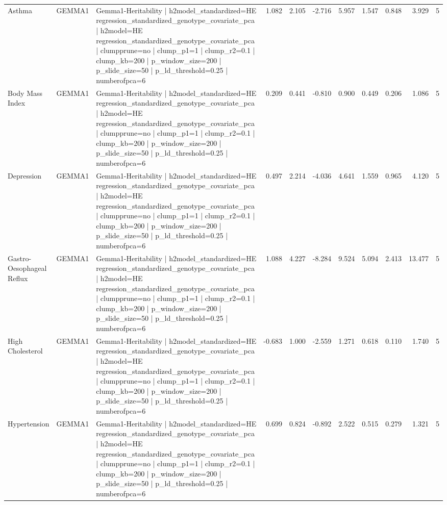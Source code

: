 \begin{landscape}
\begin{longtable}{p{2.4cm}p{1.8cm}p{6.0cm}rrrrrrrr}
Asthma & GEMMA1 & Gemma1-Heritability | h2model\_standardized=HE regression\_standardized\_genotype\_covariate\_pca | h2model=HE regression\_standardized\_genotype\_covariate\_pca | clumpprune=no | clump\_p1=1 | clump\_r2=0.1 | clump\_kb=200 | p\_window\_size=200 | p\_slide\_size=50 | p\_ld\_threshold=0.25 | numberofpca=6 & 1.082 & 2.105 & -2.716 & 5.957 & 1.547 & 0.848 & 3.929 & 5 \\
Body Mass Index & GEMMA1 & Gemma1-Heritability | h2model\_standardized=HE regression\_standardized\_genotype\_covariate\_pca | h2model=HE regression\_standardized\_genotype\_covariate\_pca | clumpprune=no | clump\_p1=1 | clump\_r2=0.1 | clump\_kb=200 | p\_window\_size=200 | p\_slide\_size=50 | p\_ld\_threshold=0.25 | numberofpca=6 & 0.209 & 0.441 & -0.810 & 0.900 & 0.449 & 0.206 & 1.086 & 5 \\
Depression & GEMMA1 & Gemma1-Heritability | h2model\_standardized=HE regression\_standardized\_genotype\_covariate\_pca | h2model=HE regression\_standardized\_genotype\_covariate\_pca | clumpprune=no | clump\_p1=1 | clump\_r2=0.1 | clump\_kb=200 | p\_window\_size=200 | p\_slide\_size=50 | p\_ld\_threshold=0.25 | numberofpca=6 & 0.497 & 2.214 & -4.036 & 4.641 & 1.559 & 0.965 & 4.120 & 5 \\
Gastro-Oesophageal Reflux & GEMMA1 & Gemma1-Heritability | h2model\_standardized=HE regression\_standardized\_genotype\_covariate\_pca | h2model=HE regression\_standardized\_genotype\_covariate\_pca | clumpprune=no | clump\_p1=1 | clump\_r2=0.1 | clump\_kb=200 | p\_window\_size=200 | p\_slide\_size=50 | p\_ld\_threshold=0.25 | numberofpca=6 & 1.088 & 4.227 & -8.284 & 9.524 & 5.094 & 2.413 & 13.477 & 5 \\
High Cholesterol & GEMMA1 & Gemma1-Heritability | h2model\_standardized=HE regression\_standardized\_genotype\_covariate\_pca | h2model=HE regression\_standardized\_genotype\_covariate\_pca | clumpprune=no | clump\_p1=1 | clump\_r2=0.1 | clump\_kb=200 | p\_window\_size=200 | p\_slide\_size=50 | p\_ld\_threshold=0.25 | numberofpca=6 & -0.683 & 1.000 & -2.559 & 1.271 & 0.618 & 0.110 & 1.740 & 5 \\
Hypertension & GEMMA1 & Gemma1-Heritability | h2model\_standardized=HE regression\_standardized\_genotype\_covariate\_pca | h2model=HE regression\_standardized\_genotype\_covariate\_pca | clumpprune=no | clump\_p1=1 | clump\_r2=0.1 | clump\_kb=200 | p\_window\_size=200 | p\_slide\_size=50 | p\_ld\_threshold=0.25 | numberofpca=6 & 0.699 & 0.824 & -0.892 & 2.522 & 0.515 & 0.279 & 1.321 & 5 \\

\end{longtable}
\end{landscape}
